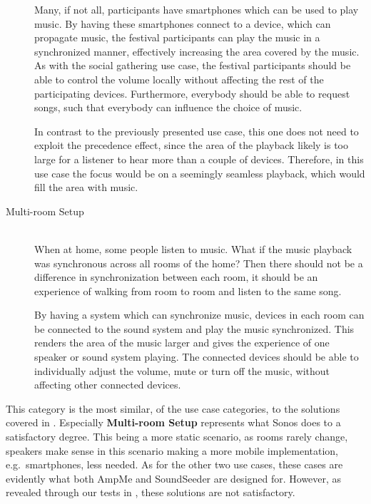 \begin{description}
        Many, if not all, participants have smartphones which can be used to play music.
        By having these smartphones connect to a device, which can propagate music,
        the festival participants can play the music in a synchronized manner,
        effectively increasing the area covered by the music.
        As with the social gathering use case,
        the festival participants should be able to control the volume locally without affecting the rest of the participating devices.
        Furthermore, everybody should be able to request songs, such that everybody can influence the choice of music.

        In contrast to the previously presented use case, this one does not need to exploit the precedence effect, since the area of the playback likely is too large for a listener to hear more than a couple of devices.
        Therefore, in this use case the focus would be on a seemingly seamless playback, which would fill the area with music.

    \item[Multi-room Setup] \hfill\\
        When at home, some people listen to music.
        What if the music playback was synchronous across all rooms of the home?
        Then there should not be a difference in synchronization between each room,
        it should be an experience of walking from room to room and listen to the same song.

        By having a system which can synchronize music, devices in each room can be connected to the sound system and play the music synchronized.
        This renders the area of the music larger and gives the experience of one speaker or sound system playing.
        The connected devices should be able to individually adjust the volume, mute or turn off the music,
        without affecting other connected devices.
\end{description}

This category is the most similar, of the use case categories, to the solutions covered in .
Especially \textbf{Multi-room Setup} represents what Sonos does to a satisfactory degree.
This being a more static scenario, as rooms rarely change, speakers make sense in this scenario making a more mobile implementation, e.g.\ smartphones, less needed.
As for the other two use cases, these cases are evidently what both AmpMe and SoundSeeder are designed for.
However, as revealed through our tests in , these solutions are not satisfactory.

